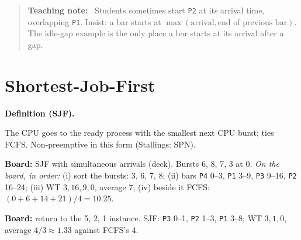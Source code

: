 \documentclass[11pt]{article}
\newenvironment{definitionbox}[1]{%
  \par\noindent\textbf{Definition (#1).}\ \itshape
}{\par\vspace{0.3em}}
\newenvironment{teachingaside}{\begin{quote}\small\color{primary-gold}\textbf{Teaching note:}\ }{\end{quote}}
\begin{document}
\begin{teachingaside}
Students sometimes start \texttt{P2} at its arrival time, overlapping \texttt{P1}. Insist: a bar starts at $\max(\text{arrival}, \text{end of previous bar})$. The idle-gap example is the only place a bar starts at its arrival after a gap.
\end{teachingaside}

\section{Shortest-Job-First}

\begin{definitionbox}{SJF}
The CPU goes to the ready process with the smallest next CPU burst; ties FCFS. Non-preemptive in this form (Stallings: SPN).
\end{definitionbox}

\textbf{Board:} SJF with simultaneous arrivals (deck). Bursts 6, 8, 7, 3 at 0. \emph{On the board, in order:} (i) sort the bursts: 3, 6, 7, 8; (ii) bars \texttt{P4} 0--3, \texttt{P1} 3--9, \texttt{P3} 9--16, \texttt{P2} 16--24; (iii) WT $3, 16, 9, 0$, average 7; (iv) beside it FCFS: $(0+6+14+21)/4 = 10.25$.

\begin{center}
\end{center}

\textbf{Board:} return to the 5, 2, 1 instance. SJF: \texttt{P3} 0--1, \texttt{P2} 1--3, \texttt{P1} 3--8; WT $3, 1, 0$, average $4/3 \approx 1.33$ against FCFS's 4.
\end{document}

